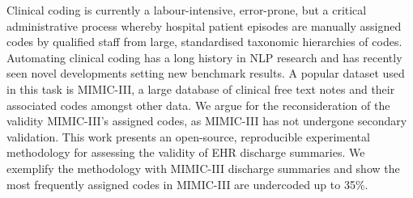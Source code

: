 Clinical coding is currently a labour-intensive, error-prone, but a critical administrative process whereby hospital patient episodes are manually assigned codes by qualified staff from large, standardised taxonomic hierarchies of codes. Automating clinical coding has a long history in NLP research and has recently seen novel developments setting new benchmark results. A popular dataset used in this task is MIMIC-III, a large database of clinical free text notes and their associated codes amongst other data. We argue for the reconsideration of the validity MIMIC-III's assigned codes, as MIMIC-III has not undergone secondary validation. This work presents an open-source, reproducible experimental methodology for assessing the validity of EHR discharge summaries. We exemplify the methodology with MIMIC-III discharge summaries and show the most frequently assigned codes in MIMIC-III are undercoded up to 35\%.
